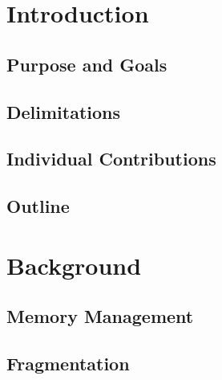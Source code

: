 \documentclass[a4paper,12pt]{article}
\begin{document}
\cleardoublepage

\mainmatter


\section{Introduction}
\label{sec:introduction}


\newpage

\subsection{Purpose and Goals}
\label{sec:purpose}


\subsection{Delimitations}
\label{sec:delimitations}


\subsection{Individual Contributions}
\label{sec:individual_contrubitons}


\subsection{Outline}
\label{sec:outline}


%

\newpage
\section{Background}
\label{sec:background}


\subsection{Memory Management}
\label{sec:memory_management}


\subsection{Fragmentation}
\label{sec:fragmentation}

\end{document}
